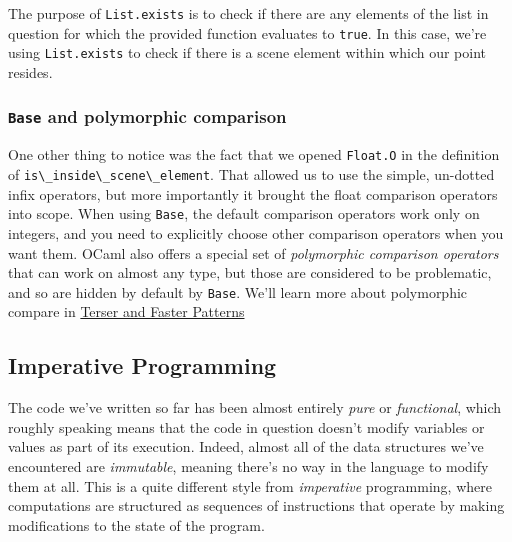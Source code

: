 The purpose of \passthrough{\lstinline!List.exists!} is to check if
there are any elements of the list in question for which the provided
function evaluates to \passthrough{\lstinline!true!}. In this case,
we're using \passthrough{\lstinline!List.exists!} to check if there is a
scene element within which our point resides.

\hypertarget{base-and-polymorphic-comparison}{%
\subsubsection{\texorpdfstring{\texttt{Base} and polymorphic
comparison}{Base and polymorphic comparison}}\label{base-and-polymorphic-comparison}}

One other thing to notice was the fact that we opened
\passthrough{\lstinline!Float.O!} in the definition of
\passthrough{\lstinline!is\_inside\_scene\_element!}. That allowed us to
use the simple, un-dotted infix operators, but more importantly it
brought the float comparison operators into scope. When using
\passthrough{\lstinline!Base!}, the default comparison operators work
only on integers, and you need to explicitly choose other comparison
operators when you want them. OCaml also offers a special set of
\emph{polymorphic comparison operators} that can work on almost any
type, but those are considered to be problematic, and so are hidden by
default by \passthrough{\lstinline!Base!}. We'll learn more about
polymorphic compare in
\href{lists-and-patterns.html\#terser-and-faster-patterns}{Terser and
Faster Patterns}

\hypertarget{imperative-programming}{%
\subsection{Imperative Programming}\label{imperative-programming}}

The code we've written so far has been almost entirely \emph{pure} or
\emph{functional}, which roughly speaking means that the code in
question doesn't modify variables or values as part of its execution.
Indeed, almost all of the data structures we've encountered are
\emph{immutable}, meaning there's no way in the language to modify them
at all. This is a quite different style from \emph{imperative}
programming, where computations are structured as sequences of
instructions that operate by making modifications to the state of the
program.

